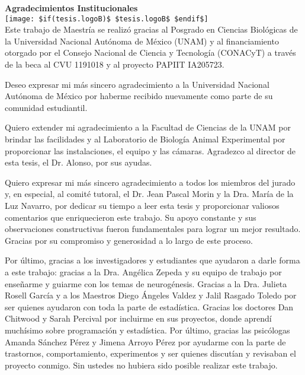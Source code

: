 \newpage
    \begin{center}
        {\large \textbf{Agradecimientos Institucionales}}\\[0.3cm]
        \texttt{[image: \$if(tesis.logoB)\$ \$tesis.logoB\$ \$endif\$]}\\[0.5cm]
        Este trabajo de Maestría se realizó gracias al Posgrado en Ciencias Biológicas de la Universidad Nacional Autónoma de México (UNAM) y al financiamiento otorgado por el Consejo Nacional de Ciencia y Tecnología (CONACyT) a través de la beca al CVU 1191018 y al proyecto PAPIIT IA205723.

        Deseo expresar mi más sincero agradecimiento a la Universidad Nacional Autónoma de México por haberme recibido nuevamente como parte de su comunidad estudiantil. 
        
        Quiero extender mi agradecimiento a la Facultad de Ciencias de la UNAM por brindar las facilidades y al Laboratorio de Biología Animal Experimental por proporcionar las instalaciones, el equipo y las cámaras. Agradezco al director de esta tesis, el Dr. Alonso, por sus ayudas.
        
        Quiero expresar mi más sincero agradecimiento a todos los miembros del jurado y, en especial, al comité tutoral, el Dr. Jean Pascal Morin y la Dra. María de la Luz Navarro, por dedicar su tiempo a leer esta tesis y proporcionar valiosos comentarios que enriquecieron este trabajo. Su apoyo constante y sus observaciones constructivas fueron fundamentales para lograr un mejor resultado. Gracias por su compromiso y generosidad a lo largo de este proceso.
        
        Por último, gracias a los investigadores y estudiantes que ayudaron a darle forma a este trabajo: gracias a la Dra. Angélica Zepeda y su equipo de trabajo por enseñarme y guiarme con los temas de neurogénesis. Gracias a la Dra. Julieta Rosell García y a los Maestros Diego Ángeles Valdez y Jalil Rasgado Toledo por ser quienes ayudaron con toda la parte de estadística. Gracias los doctores Dan Chitwood y Sarah Percival por incluirme en sus proyectos, donde aprendí muchísimo sobre programación y estadística. Por último, gracias las psicólogas Amanda Sánchez Pérez y Jimena Arroyo Pérez por ayudarme con la parte de trastornos, comportamiento, experimentos y ser quienes discutían y revisaban el proyecto conmigo. Sin ustedes no hubiera sido posible realizar este trabajo.
    \end{center}




